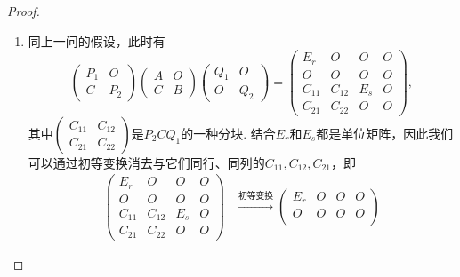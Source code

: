 \begin{enumerate}
\begin{proof}
\begin{enumerate}
                  \item 同上一问的假设，此时有
                        \[
                            \begin{pmatrix}
                                P_1 & O \\ C & P_2
                            \end{pmatrix}
                            \begin{pmatrix}
                                A & O \\ C & B
                            \end{pmatrix}
                            \begin{pmatrix}
                                Q_1 & O \\ O & Q_2
                            \end{pmatrix}
                             =\begin{pmatrix}
                                    E_r & O & O & O \\ O & O & O & O \\ C_{11} & C_{12} & E_s & O \\ C_{21} & C_{22} & O & O
                                \end{pmatrix},
                        \]
                        其中$\begin{pmatrix}
                                C_{11} & C_{12} \\ C_{21} & C_{22}
                            \end{pmatrix}$是$P_2CQ_1$的一种分块. 结合$E_r$和$E_s$都是单位矩阵，因此我们可以通过初等变换消去与它们同行、同列的$C_{11},C_{12},C_{21}$，即
                        \begin{align*}
                            \begin{pmatrix}
                                E_r    & O      & O   & O \\
                                O      & O      & O   & O \\
                                C_{11} & C_{12} & E_s & O \\
                                C_{21} & C_{22} & O   & O
                            \end{pmatrix}
                             & \xrightarrow{\text{初等变换}}\begin{pmatrix}
                                                                E_r & O      & O   & O \\
                                                                O   & O      & O   & O \\

\end{pmatrix}
\end{align*}
\end{enumerate}
\end{proof}
\end{enumerate}
